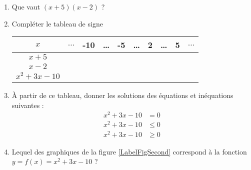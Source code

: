 
\begin{exercice}\label{exoPremiere-0030}


\begin{enumerate}
    \item
        Que vaut \( (x+5)(x-2)\) ?
    \item
        Compléter le tableau de signe
        \begin{center}
            \begin{tabular}[h]{|c||c|c|c|c|c|c|c|c|c|}
                \hline
                    \( x\)&\( \ldots\)&-10&\ldots&-5&\ldots&2&\ldots&5&\( \ldots\)\\
                    \hline
                    \( x+5\)& & & & & & & && \\
                    \hline
                    \( x-2\)&&&&&&&&&\\
                    \hline
                    \(x^2+3x-10\)&&&&&&&&&\\
                    \hline
            \end{tabular}
        \end{center}
    \item
        À partir de ce tableau, donner les solutions des équations et inéquations suivantes :
        \begin{subequations}
            \begin{align}
                x^2+3x-10&=0\\
                x^2+3x-10&\leq0\\
                x^2+3x-10&\geq0
            \end{align}
        \end{subequations}
    \item
        Lequel des graphiques de la figure \ref{LabelFigSecond} correspond à la fonction \( y=f(x)=x^2+3x-10\) ?
\newcommand{\CaptionFigSecond}{Laquelle de ces trois courbes est \( x^2+3x-10\) ?}

\end{enumerate}

\end{exercice}
